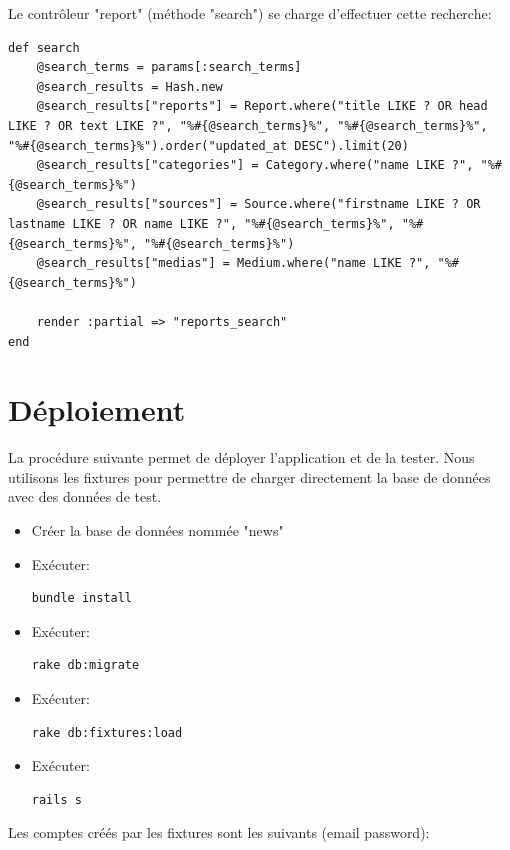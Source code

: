 \documentclass{article}
\begin{document}
Le contrôleur "report" (méthode "search") se charge d'effectuer cette recherche:

\begin{lstlisting}
def search
	@search_terms = params[:search_terms]
	@search_results = Hash.new
	@search_results["reports"] = Report.where("title LIKE ? OR head LIKE ? OR text LIKE ?", "%#{@search_terms}%", "%#{@search_terms}%", "%#{@search_terms}%").order("updated_at DESC").limit(20)
	@search_results["categories"] = Category.where("name LIKE ?", "%#{@search_terms}%")
	@search_results["sources"] = Source.where("firstname LIKE ? OR lastname LIKE ? OR name LIKE ?", "%#{@search_terms}%", "%#{@search_terms}%", "%#{@search_terms}%")
	@search_results["medias"] = Medium.where("name LIKE ?", "%#{@search_terms}%")
	
	render :partial => "reports_search"
end
\end{lstlisting}

\newpage
\section{Déploiement}

La procédure suivante permet de déployer l'application et de la tester. Nous utilisons les fixtures pour permettre de charger directement la base de données avec des données de test.

\begin{itemize}
\item Créer la base de données nommée "news"
\item Exécuter: \begin{verbatim}bundle install\end{verbatim}
\item Exécuter: \begin{verbatim}rake db:migrate\end{verbatim}
\item Exécuter: \begin{verbatim}rake db:fixtures:load\end{verbatim}
\item Exécuter: \begin{verbatim}rails s\end{verbatim}
\end{itemize}

\par\null\par

Les comptes créés par les fixtures sont les suivants (email password):
\end{document}
